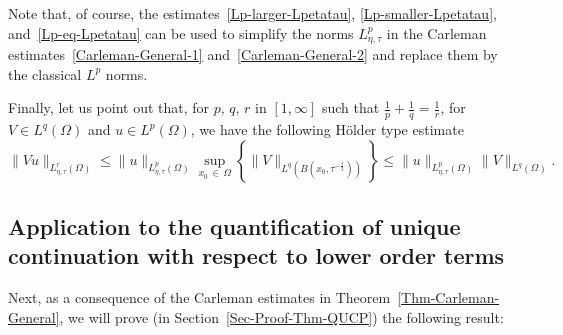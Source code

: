 \documentclass[10pt]{amsart}
\theoremstyle{definition}\newtheorem{defi}[theo]{Definition}\newtheorem{rema}[theo]{Remark}\newtheorem{exam}[theo]{Example}\newtheorem{exem}[theo]{Example}\newtheorem{nota}[theo]{Notation}
\renewcommand{\leq}{\leqslant}
\begin{document}
Note that, of course, the estimates~\eqref{Lp-larger-Lpetatau}, \eqref{Lp-smaller-Lpetatau}, and~\eqref{Lp-eq-Lpetatau} can be used to simplify the norms $L^p_{\eta, \tau}$ in the Carleman estimates~\eqref{Carleman-General-1} and~\eqref{Carleman-General-2} and replace them by the classical $L^p$ norms.

Finally, let us point out that, for $p,\, q, \, r$ in $[1, \infty]$ such that $\frac{1}{p} + \frac{1}{q} = \frac{1}{r}$, for $V \in L^q(\Omega)$ and $u \in L^p(\Omega)$, we have the following Hölder type estimate
\begin{equation}\label{Holder-in-Lp-tau-eta}
\| Vu \|_{L^r_{\eta, \tau}(\Omega)}
\leq \| u\|_{L^p_{\eta, \tau}(\Omega)} \sup_{x_0\,\in\,\Omega} \left\{ \| V\|_{L^q\left(B\left(x_0, \tau^{-\frac{1}{3}}\right)\right)} \right\}
\leq \| u\|_{L^p_{\eta, \tau}(\Omega)} \| V \|_{L^q(\Omega)}.
\end{equation}


\subsection*{Application to the quantification of unique continuation with respect to lower order terms}

 Next, as a consequence of the Carleman estimates in Theorem~\ref{Thm-Carleman-General}, we will prove (in Section~\ref{Sec-Proof-Thm-QUCP}) the following result:
\end{document}
